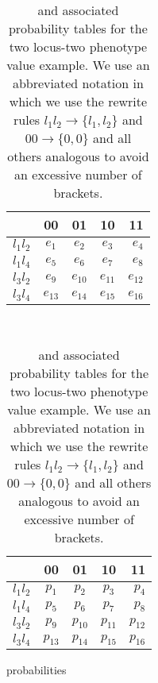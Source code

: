 \begin{table}[!ht]
\centering
\begin{subtable}[t]{0.4\textwidth}
\centering
\begin{tabular}{ l || c | c | c | r }
	          &	00 & 01 & 10 & 11\\ \hline
    $l_1 l_2$ & $e_1$ & $e_2$ & $e_3$ & $e_4$\\ \hline
    $l_1 l_4$ & $e_5$ & $e_6$ & $e_7$ & $e_8$\\ \hline
    $l_3 l_2$ & $e_9$ & $e_{10}$ & $e_{11}$ & $e_{12}$\\ \hline
    $l_3 l_4$ & $e_{13}$ & $e_{14}$ & $e_{15}$ & $e_{16}$\\
    \hline
    \end{tabular}
    \caption{\gnpm{}}
    \label{tab:gpm}
\end{subtable}
~~~~~~
\begin{subtable}[t]{0.4\textwidth}
\centering
	\begin{tabular}{ l || c | c | c | r }
	          &	00 & 01 & 10 & 11\\ \hline
    $l_1 l_2$ & $p_1$ & $p_2$ & $p_3$ & $p_4$\\ \hline
    $l_1 l_4$ & $p_5$ & $p_6$ & $p_7$ & $p_8$\\ \hline
    $l_3 l_2$ & $p_9$ & $p_{10}$ & $p_{11}$ & $p_{12}$\\ \hline
    $l_3 l_4$ & $p_{13}$ & $p_{14}$ & $p_{15}$ & $p_{16}$\\
    \hline
	\end{tabular}
	\caption{probabilities}
    \label{tab:probabilities}
\end{subtable}
\caption{\gnpm{} and associated probability tables for the two locus-two phenotype value example. We use an abbreviated notation in which we use the rewrite rules $l_1 l_2 \rightarrow \{l_1, l_2\}$ and $00 \rightarrow \{0, 0\}$ and all others analogous to avoid an excessive number of brackets.}
\label{tab:example}
\end{table}
